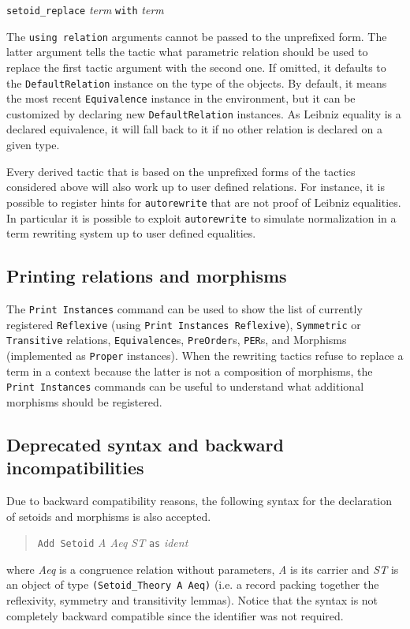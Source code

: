 \texttt{setoid\_replace} \textit{term} \texttt{with} \textit{term}
~
~
~
\medskip

The \texttt{using relation}
arguments cannot be passed to the unprefixed form. The latter argument
tells the tactic what parametric relation should be used to replace
the first tactic argument with the second one. If omitted, it defaults
to the \texttt{DefaultRelation} instance on the type of the objects.
By default, it means the most recent \texttt{Equivalence} instance in
the environment, but it can be customized by declaring new
\texttt{DefaultRelation} instances. As Leibniz equality is a declared
equivalence, it will fall back to it if no other relation is declared on
a given type.

Every derived tactic that is based on the unprefixed forms of the tactics
considered above will also work up to user defined relations. For instance,
it is possible to register hints for \texttt{autorewrite} that are
not proof of Leibniz equalities. In particular it is possible to exploit
\texttt{autorewrite} to simulate normalization in a term rewriting system
up to user defined equalities.

\subsection{Printing relations and morphisms}
The \texttt{Print Instances} command can be used to show the list of
currently registered \texttt{Reflexive} (using \texttt{Print Instances Reflexive}),
\texttt{Symmetric} or \texttt{Transitive} relations,
\texttt{Equivalence}s, \texttt{PreOrder}s, \texttt{PER}s, and
Morphisms (implemented as \texttt{Proper} instances). When
 the rewriting tactics refuse to replace a term in a context
because the latter is not a composition of morphisms, the \texttt{Print Instances}
commands can be useful to understand what additional morphisms should be
registered.

\subsection{Deprecated syntax and backward incompatibilities}
Due to backward compatibility reasons, the following syntax for the
declaration of setoids and morphisms is also accepted.

\begin{quote}
  \texttt{Add Setoid} \textit{A Aeq ST} \texttt{as} \textit{ident}
\end{quote}
where \textit{Aeq} is a congruence relation without parameters,
\textit{A} is its carrier and \textit{ST} is an object of type
\texttt{(Setoid\_Theory A Aeq)} (i.e. a record packing together the reflexivity,
symmetry and transitivity lemmas). Notice that the syntax is not completely
backward compatible since the identifier was not required.

